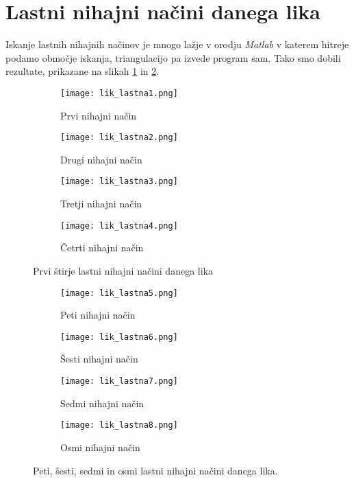 \documentclass[12pt,a4paper]{article}
\begin{document}
\section*{Lastni nihajni načini danega lika}

Iskanje lastnih nihajnih načinov je mnogo lažje v orodju \textit{Matlab} v katerem hitreje podamo območje iskanja, triangulacijo pa izvede program sam. Tako smo dobili rezultate, prikazane na slikah \ref{fig:slika8} in \ref{fig:slika9}.

\begin{figure}[H]
    \centering
    \begin{subfigure}[b]{0.4\textwidth}  			
        \texttt{[image: lik\_lastna1.png]}
        \caption{Prvi nihajni način}
    \end{subfigure}
        \begin{subfigure}[b]{0.4\textwidth}  			
        \texttt{[image: lik\_lastna2.png]}
        \caption{Drugi nihajni način}
    \end{subfigure}
    
        \begin{subfigure}[b]{0.4\textwidth}  			
        \texttt{[image: lik\_lastna3.png]}
        \caption{Tretji nihajni način}
    \end{subfigure}
        \begin{subfigure}[b]{0.4\textwidth}  			
        \texttt{[image: lik\_lastna4.png]}
        \caption{Četrti nihajni način}
    \end{subfigure}
    \caption{Prvi štirje lastni nihajni načini danega lika} \label{fig:slika8}
\end{figure}

\begin{figure}[H]
    \centering
    \begin{subfigure}[b]{0.4\textwidth}  			
        \texttt{[image: lik\_lastna5.png]}
        \caption{Peti nihajni način}
    \end{subfigure}
        \begin{subfigure}[b]{0.4\textwidth}  			
        \texttt{[image: lik\_lastna6.png]}
        \caption{Šesti nihajni način}
    \end{subfigure}
    
        \begin{subfigure}[b]{0.4\textwidth}  			
        \texttt{[image: lik\_lastna7.png]}
        \caption{Sedmi nihajni način}
    \end{subfigure}
        \begin{subfigure}[b]{0.4\textwidth}  			
        \texttt{[image: lik\_lastna8.png]}
        \caption{Osmi nihajni način}
    \end{subfigure}
    \caption{Peti, šesti, sedmi in osmi lastni nihajni načini danega lika.} \label{fig:slika9}
\end{figure}
\end{document}
